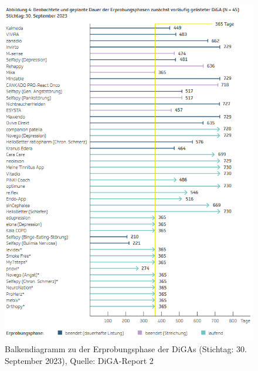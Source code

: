 \documentclass{article}
\begin{document}
			\begin{figure}[htbp]
				\centering
				\includegraphics[height=0.5\textheight]{./grafiken/erprobungs_phase_diga}
				\centering
				\caption[Erprobungsphase von DiGAs]{Balkendiagramm zu der Erprobungsphase der DiGAs (Stichtag: 30. September 2023), Quelle: DiGA-Report 2 \cite{TK-Report-2}}
				\label{Abb-erprobungsphase-diga}
			\end{figure}
\end{document}
